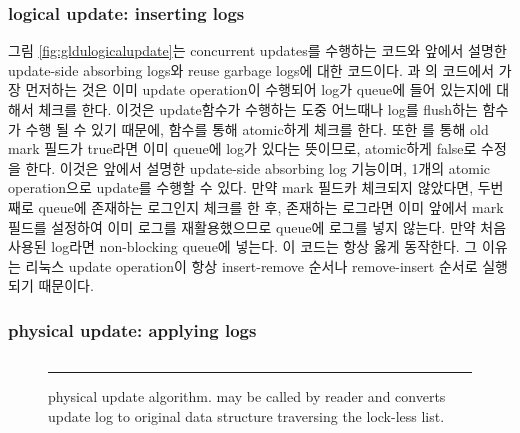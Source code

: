 \subsubsection{logical update: inserting logs}
\ifkor

그림 \ref{fig:gldulogicalupdate}는 concurrent updates를 수행하는 코드와 앞에서 설명한 update-side
absorbing logs와 reuse garbage logs에 대한 코드이다. 과
의 코드에서 가장 먼저하는 것은 이미 update operation이 수행되어 log가 queue에 들어
있는지에 대해서 체크를 한다. 이것은 update함수가 수행하는 도중 어느때나 log를 flush하는  함수가
수행 될 수 있기 때문에,  함수를 통해 atomic하게 체크를 한다. 또한 를 통해 old mark
필드가 true라면 이미 queue에 log가 있다는 뜻이므로, atomic하게 false로 수정을 한다.
이것은 앞에서 설명한 update-side absorbing log 기능이며, 1개의 atomic operation으로 update를 수행할 수
있다.
만약 mark 필드카 체크되지 않았다면, 두번째로 queue에 존재하는 로그인지 체크를 한 후, 존재하는 로그라면
이미 앞에서 mark필드를 설정하여 이미 로그를 재활용했으므로 queue에 로그를 넣지 않는다.
만약 처음 사용된 log라면 non-blocking queue에 넣는다.
이 코드는 항상 옳게 동작한다.  
그 이유는 리눅스 update operation이 항상 insert-remove 순서나 remove-insert 순서로 실행되기 때문이다.
\else

\fi


\subsubsection{physical update: applying logs}


\begin{figure}[tb!]
\inputminted[linenos,fontsize=\footnotesize, tabsize=2]{c}{src/ldu_physical.c}
\rule{\columnwidth}{0.5pt}
\vspace{-\baselineskip}
\caption{ physical update algorithm.  may be
 called by reader and converts update log to original data structure
 traversing the lock-less list.}
\label{fig:glduphysicalupdate}
\end{figure}

